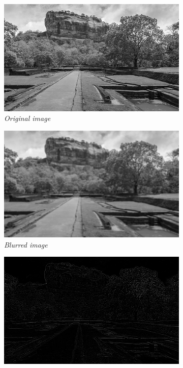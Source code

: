\documentclass[11pt, a4paper]{article}
\begin{document}
\begin{figure}[H]
	\centering
	\begin{subfigure}[b]{0.24\textwidth}
		\centering
		\includegraphics[width=\textwidth]{./Outputs/sigiriya_gray.png}
		\caption{{\small \textit{Original image}}}
	\end{subfigure}
	\hfill
	\begin{subfigure}[b]{0.24\textwidth}
		\centering
		\includegraphics[width=\textwidth]{./Outputs/Blurred_Image.png}
		\caption{{\small \textit{Blurred image}}}
		\label{fig:Unblur Image}
	\end{subfigure}
	\hfill
	\begin{subfigure}[b]{0.24\textwidth}
		\centering
		\includegraphics[width=\textwidth]{./Outputs/Difference_Image.png}

\end{subfigure}
\end{figure}
\end{document}
